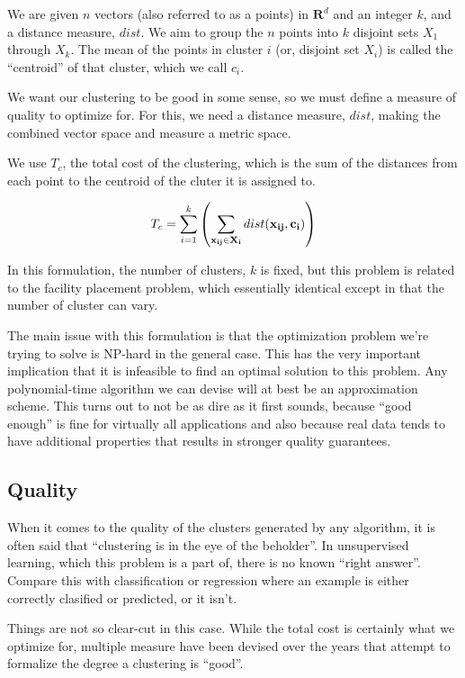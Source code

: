 \documentclass{article}
\begin{document}
We are given $n$ vectors (also referred to as a points) in $\textbf{R}^d$ and an
integer $k$, and a distance measure, $dist$. We aim to group the $n$ points
into $k$ disjoint sets $X_1$ through $X_k$. The mean of
the points in cluster $i$ (or, disjoint set $X_i$) is called the ``centroid''
of that cluster, which we call $c_i$.

We want our clustering to be good in some sense, so we must define a measure of
quality to optimize for. For this, we need a distance measure, $dist$, making the combined vector space and measure a metric space.

We use $T_c$, the total cost of the clustering, which is the sum of the distances
from each point to the centroid of the cluter it is assigned to. 

\begin{eqnarray}
    T_c = \sum_{i = 1}^{k} \left( \sum_{\bf x_{ij} \in X_i} dist({\bf x_{ij}},
    {\bf c_i})
    \right)
\end{eqnarray}

In this formulation, the number of clusters, $k$ is fixed, but this problem is
related to the facility placement problem, which essentially identical except
in that the number of cluster can vary.

The main issue with this formulation is that the optimization problem we're
trying to solve is NP-hard in the general case.
This has the very important implication that it is infeasible to find an
optimal solution to this problem. Any polynomial-time algorithm we can devise
will at best be an approximation scheme.
This turns out to not be as dire as it first sounds, because ``good enough'' is
fine for virtually all applications and also because real data tends to have
additional properties that results in stronger quality guarantees.

\subsection{Quality}

When it comes to the quality of the clusters generated by any algorithm, it is
often said that ``clustering is in the eye of the beholder''.
In unsupervised learning, which this problem is a part of, there is no
known ``right answer''. Compare this with classification or regression where an
example is either correctly clasified or predicted, or it isn't.

Things are not so clear-cut in this case. While the total cost is certainly
what we optimize for, multiple measure have been devised over the years that
attempt to formalize the degree a clustering is ``good''.
\end{document}
